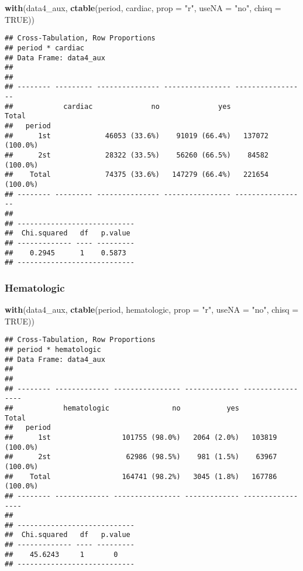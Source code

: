 \documentclass[
]{article}
\newenvironment{Shaded}{\begin{snugshade}}{\end{snugshade}}
\newcommand{\DataTypeTok}[1]{\textcolor[rgb]{0.13,0.29,0.53}{#1}}
\newcommand{\KeywordTok}[1]{\textcolor[rgb]{0.13,0.29,0.53}{\textbf{#1}}}
\newcommand{\NormalTok}[1]{#1}
\newcommand{\OtherTok}[1]{\textcolor[rgb]{0.56,0.35,0.01}{#1}}
\newcommand{\StringTok}[1]{\textcolor[rgb]{0.31,0.60,0.02}{#1}}
\begin{document}
\begin{Shaded}
\begin{Highlighting}[]
\KeywordTok{with}\NormalTok{(data4_aux, }\KeywordTok{ctable}\NormalTok{(period, cardiac, }\DataTypeTok{prop =} \StringTok{"r"}\NormalTok{, }\DataTypeTok{useNA =} \StringTok{"no"}\NormalTok{, }\DataTypeTok{chisq =} \OtherTok{TRUE}\NormalTok{))}
\end{Highlighting}
\end{Shaded}

\begin{verbatim}
## Cross-Tabulation, Row Proportions  
## period * cardiac  
## Data Frame: data4_aux  
## 
## 
## -------- --------- --------------- ---------------- -----------------
##            cardiac              no              yes             Total
##   period                                                             
##      1st             46053 (33.6%)    91019 (66.4%)   137072 (100.0%)
##      2st             28322 (33.5%)    56260 (66.5%)    84582 (100.0%)
##    Total             74375 (33.6%)   147279 (66.4%)   221654 (100.0%)
## -------- --------- --------------- ---------------- -----------------
## 
## ----------------------------
##  Chi.squared   df   p.value 
## ------------- ---- ---------
##    0.2945      1    0.5873  
## ----------------------------
\end{verbatim}

\hypertarget{hematologic}{%
\subsubsection{Hematologic}\label{hematologic}}

\begin{Shaded}
\begin{Highlighting}[]
\KeywordTok{with}\NormalTok{(data4_aux, }\KeywordTok{ctable}\NormalTok{(period, hematologic, }\DataTypeTok{prop =} \StringTok{"r"}\NormalTok{, }\DataTypeTok{useNA =} \StringTok{"no"}\NormalTok{, }\DataTypeTok{chisq =} \OtherTok{TRUE}\NormalTok{))}
\end{Highlighting}
\end{Shaded}

\begin{verbatim}
## Cross-Tabulation, Row Proportions  
## period * hematologic  
## Data Frame: data4_aux  
## 
## 
## -------- ------------- ---------------- ------------- -----------------
##            hematologic               no           yes             Total
##   period                                                               
##      1st                 101755 (98.0%)   2064 (2.0%)   103819 (100.0%)
##      2st                  62986 (98.5%)    981 (1.5%)    63967 (100.0%)
##    Total                 164741 (98.2%)   3045 (1.8%)   167786 (100.0%)
## -------- ------------- ---------------- ------------- -----------------
## 
## ----------------------------
##  Chi.squared   df   p.value 
## ------------- ---- ---------
##    45.6243     1       0    
## ----------------------------
\end{verbatim}
\end{document}
